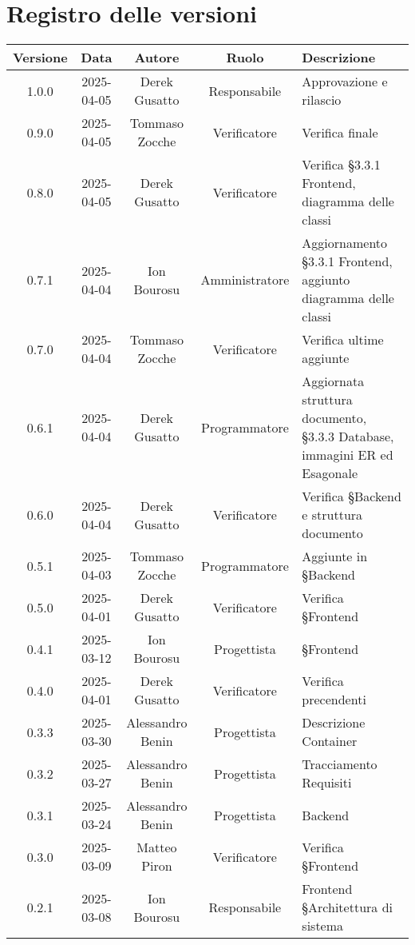 \section*{Registro delle versioni}

\begin{longtable}{|c|c|c|c|p{4cm}|}
    \hline
    \textbf{Versione} & \textbf{Data} & \textbf{Autore} & \textbf{Ruolo} & \textbf{Descrizione} \\
    \endhead
    \hline
    1.0.0 & 2025-04-05 & Derek Gusatto & Responsabile & Approvazione e rilascio \\
    \hline
    0.9.0 & 2025-04-05 & Tommaso Zocche & Verificatore & Verifica finale \\
    \hline
    0.8.0 & 2025-04-05 & Derek Gusatto & Verificatore & Verifica §3.3.1 Frontend, diagramma delle classi \\
    \hline
    0.7.1 & 2025-04-04 & Ion Bourosu & Amministratore & Aggiornamento §3.3.1 Frontend, aggiunto diagramma delle classi \\
    \hline 
    0.7.0 & 2025-04-04 & Tommaso Zocche & Verificatore & Verifica ultime aggiunte \\
    \hline 
     0.6.1 & 2025-04-04 & Derek Gusatto & Programmatore & Aggiornata struttura documento, §3.3.3 Database, immagini ER ed Esagonale \\
    \hline 
     0.6.0 & 2025-04-04 & Derek Gusatto & Verificatore & Verifica §Backend e struttura documento \\
    \hline 
    0.5.1 & 2025-04-03 & Tommaso Zocche & Programmatore & Aggiunte in §Backend \\
    \hline 
    0.5.0 & 2025-04-01 & Derek Gusatto & Verificatore & Verifica §Frontend \\
        \hline
    0.4.1 & 2025-03-12 & Ion Bourosu & Progettista & §Frontend \\ 
    \hline
    0.4.0 & 2025-04-01 &  Derek Gusatto & Verificatore & Verifica precendenti \\
    \hline
    0.3.3 & 2025-03-30 &  Alessandro Benin & Progettista & Descrizione Container \\
    \hline
0.3.2 & 2025-03-27 &  Alessandro Benin & Progettista & Tracciamento Requisiti \\
    \hline
    0.3.1 & 2025-03-24 &  Alessandro Benin & Progettista & Backend \\
    \hline
        0.3.0 & 2025-03-09 & Matteo Piron & Verificatore & Verifica §Frontend \\
        \hline
        0.2.1 & 2025-03-08 & Ion Bourosu & Responsabile & Frontend  §Architettura di sistema \\

\end{longtable}
